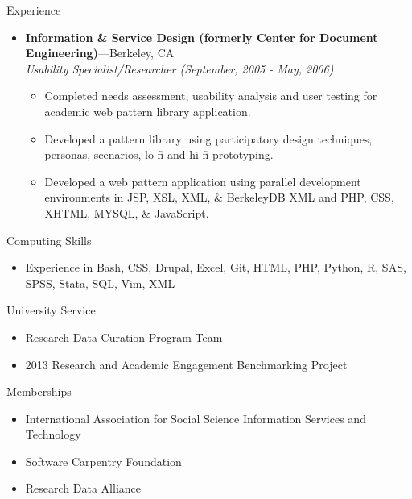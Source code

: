 \documentclass[11pt,oneside]{article}
\newenvironment{ressection}[1]{
	\vspace{4pt}
	{\fontfamily{phv}\selectfont\Large#1}
	\begin{itemize}
	\vspace{3pt}
}{
	\end{itemize}
}
\newcommand{\resitem}[1]{
	\vspace{-4pt}
	\item \begin{flushleft} #1 \end{flushleft}
}
\newcommand{\ressubitem}[1]{
	\vspace{-1pt}
	\item \begin{flushleft} #1 \end{flushleft}
}
\newcommand{\resbigitem}[3]{
	\vspace{-5pt}
	\item
	\textbf{#1}---#2 \\
	\textit{#3}
}
\newenvironment{ressubsec}[3]{
	\resbigitem{#1}{#2}{#3}
	\vspace{-2pt}
	\begin{itemize}
}{
	\end{itemize}
}
\begin{document}
\begin{ressection}{Experience}
	\begin{ressubsec}{Information \& Service Design (formerly Center for Document Engineering)}{Berkeley, CA}{Usability Specialist/Researcher (September, 2005 - May, 2006)}
	  \ressubitem{Completed needs assessment, usability analysis and user testing for academic web pattern library application.}
	  \ressubitem{Developed a pattern library using participatory design techniques, personas, scenarios, lo-fi and hi-fi prototyping.}
	  \ressubitem{Developed a web pattern application using parallel development environments in JSP, XSL, XML, \& BerkeleyDB XML and PHP, CSS, XHTML, MYSQL, \& JavaScript.}
	\end{ressubsec}
\end{ressection}

\begin{ressection}{Computing Skills}

	\resitem{Experience in Bash, CSS, Drupal, Excel, Git, HTML, PHP, Python, R, SAS, SPSS, Stata, SQL, Vim, XML}	

\end{ressection}





\begin{ressection}{University Service}
	\ressubitem{Research Data Curation Program Team}
	\ressubitem{2013 Research and Academic Engagement Benchmarking Project}

\end{ressection}

\begin{ressection}{Memberships}
	\resitem{International Association for Social Science Information Services and Technology}
	\resitem{Software Carpentry Foundation}
	\resitem{Research Data Alliance}
\end{ressection}
\end{document}

